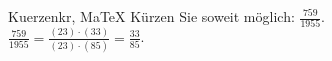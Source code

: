 \begin{MAufgabe}{Kuerzen}{kr, MaTeX}
K\"urzen Sie soweit m\"oglich: $\frac{759}{1955}$.\\ 
\ifLsg\MLoesung
\quad $\frac{759}{1955}=\frac{(23)\cdot(33)}{(23)\cdot(85)}=\frac{33}{85}$.\else\relax\fi
 \end{MAufgabe}